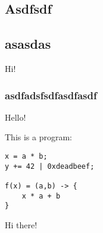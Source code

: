 \documentclass[a4paper]{article}
\begin{document}
\begin{labReport}

\section{Asdfsdf}
\subsection{asasdas}

Hi!

\subsubsection{asdfadsfsdfasdfasdf}

Hello! \par
This is a program:

\begin{lstlisting}
x = a * b;
y += 42 | 0xdeadbeef;

f(x) = (a,b) -> {
	x * a + b
}
\end{lstlisting}

Hi there!

\end{labReport}
\end{document}
